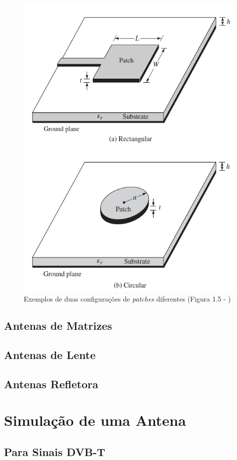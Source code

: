 \begin{figure}[h]
\centering
\includegraphics[scale=0.6]{chapters/ch3/assets/microstrip}
\decoRule
\caption[Antena \textit{Microstrip}]{Exemplos de duas configurações de \textit{patches} diferentes (Figura 1.5 - \cite{Balanis2016})}
\label{fig:microstrip}
\end{figure}

\subsection*{Antenas de Matrizes}

\subsection*{Antenas de Lente}

\subsection*{Antenas Refletora}



\section{Simulação de uma Antena}


\subsection{Para Sinais DVB-T}

